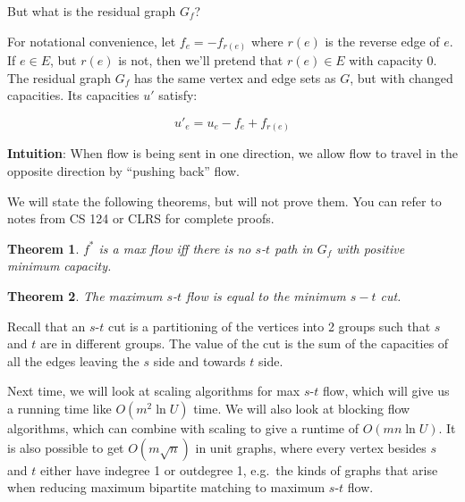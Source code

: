 \documentclass[11pt]{article}
\newtheorem{theorem}{Theorem}
\begin{document}
But what is the residual graph $G_f$? 

For notational convenience, let $f_{e} = -f_{r(e)}$ where $r(e)$ is the reverse edge of $e$. If $e\in E$, but $r(e)$ is not, then we'll pretend that $r(e) \in E$ with capacity $0$. The residual graph $G_f$ has the same vertex and edge sets as $G$, but with changed capacities. Its capacities $u'$ satisfy:

$$u'_e = u_e - f_e + f_{r(e)}$$

\textbf{Intuition}: When flow is being sent in one direction, we allow flow to travel in the opposite direction by ``pushing back'' flow.

We will state the following theorems, but will not prove them. You can refer to notes from CS 124 or CLRS for complete proofs. 

\begin{theorem} 
$f^*$ is a max flow iff there is no $s$-$t$ path in $G_f$ with positive minimum capacity.
\end{theorem}

\begin{theorem} 
The maximum $s$-$t$ flow is equal to the minimum $s-t$ cut. 
\end{theorem}
Recall that an $s$-$t$ cut is a partitioning of the vertices into 2 groups such that $s$ and $t$ are in different groups. The value of the cut is the sum of the capacities of all the edges leaving the $s$ side and towards $t$ side.

Next time, we will look at scaling algorithms for max $s$-$t$ flow, which will give us a running time like $O(m^2 \ln U)$ time. We will also look at blocking flow algorithms, which can combine with scaling to give a runtime of $O(mn \ln U)$. It is also possible to get $O(m \sqrt{n})$ in unit graphs, where every vertex besides $s$ and $t$ either have indegree 1 or outdegree 1, e.g.\ the kinds of graphs that arise when reducing maximum bipartite matching to maximum $s$-$t$ flow.


\end{document}
